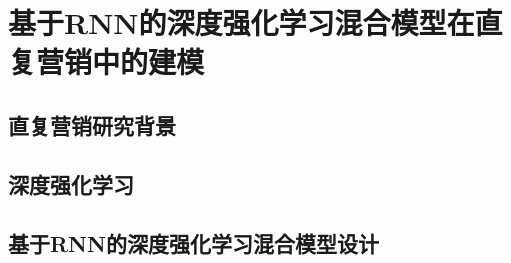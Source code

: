 \chapter{基于RNN的深度强化学习混合模型在直复营销中的建模}


\section{直复营销研究背景}


\section{深度强化学习}


\section{基于RNN的深度强化学习混合模型设计}